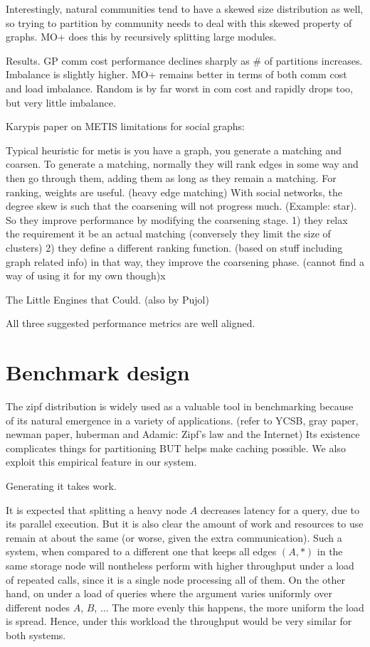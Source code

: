 \documentclass{article}
\begin{document}
Interestingly, natural communities tend to have a skewed size distribution as well, so trying to partition by community needs to deal 
with this skewed property of graphs.  MO+ does this by recursively splitting large modules. 

Results.  GP comm cost performance declines sharply as # of partitions increases. Imbalance is slightly higher.
MO+ remains better in terms of both comm cost and load imbalance.
Random is by far worst in com cost and rapidly drops too, but very little imbalance.

Karypis paper on METIS limitations for social graphs:

Typical heuristic for metis is you have a graph, you generate a matching and coarsen. 
To generate a matching, normally they will rank edges in some way and then go through them, adding them 
as long as they remain a matching. For ranking, weights are useful. (heavy edge matching)
With social networks, the degree skew is such that the coarsening will not progress much. 
(Example: star). So they improve performance by modifying the coarsening stage. 1) they relax the requirement it be an actual
matching (conversely they limit the size of clusters) 2) they define a different ranking function. (based on stuff including graph related info)
in that way, they improve the coarsening phase. (cannot find a way of using it for my own though)x


The Little Engines that Could. (also by Pujol)


All three suggested performance metrics are well aligned.



\section{Benchmark design}

The zipf distribution is widely used as a valuable tool in benchmarking because of its natural emergence in a variety of applications. (refer to YCSB, gray paper, newman paper, huberman and Adamic: 
Zipf’s law and the Internet) Its existence complicates things for partitioning BUT helps make caching possible. We also exploit this empirical feature in our system.

Generating it takes work.

It is expected that splitting a heavy node \( A \)  decreases latency for a \fanoutq[ A ] query, due to its parallel execution.  But it is also clear the amount of work and resources to use remain at about the same (or worse, given the extra communication).  Such a system, when compared to a different one that keeps all edges \( \left(A, * \right) \) in the same storage node  will nontheless perform with higher throughput under a load of repeated \fanoutq[A] calls, since it is a single node processing all of them.  On the other hand, on under a load of \fanoutq{*} queries where the argument varies uniformly over different nodes $A$, $B$, ... The more evenly this happens, the more uniform the load is spread. Hence, under this workload the throughput would be very similar for both systems.    
\end{document}
